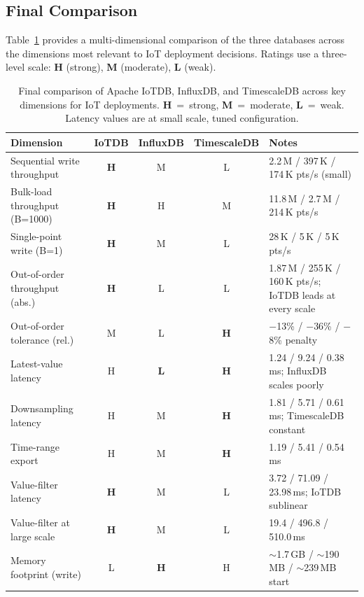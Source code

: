 \subsection{Final Comparison}

Table~\ref{tab:final} provides a multi-dimensional comparison of the three databases
across the dimensions most relevant to IoT deployment decisions. Ratings use a three-level
scale: \textbf{H} (strong), \textbf{M} (moderate), \textbf{L} (weak).

\begin{table}[t]
  \centering
  \caption{Final comparison of Apache IoTDB, InfluxDB, and TimescaleDB across key dimensions
           for IoT deployments. \textbf{H}~=~strong, \textbf{M}~=~moderate, \textbf{L}~=~weak.
           Latency values are at small scale, tuned configuration.}
  \label{tab:final}
  \begin{tabular}{lcccl}
    \hline
    \textbf{Dimension} & \textbf{IoTDB} & \textbf{InfluxDB} & \textbf{TimescaleDB} & \textbf{Notes} \\
    \hline
    Sequential write throughput   & \textbf{H} & M & L & 2.2\,M / 397\,K / 174\,K pts/s (small) \\
    Bulk-load throughput (B=1000) & \textbf{H} & H & M & 11.8\,M / 2.7\,M / 214\,K pts/s \\
    Single-point write (B=1)      & \textbf{H} & M & L & 28\,K / 5\,K / 5\,K pts/s \\
    Out-of-order throughput (abs.) & \textbf{H} & L & L & 1.87\,M / 255\,K / 160\,K pts/s; IoTDB leads at every scale \\
    Out-of-order tolerance (rel.) & M & L & \textbf{H} & $-$13\% / $-$36\% / $-$8\% penalty \\
    Latest-value latency          & H & \textbf{L} & \textbf{H} & 1.24 / 9.24 / 0.38\,ms; InfluxDB scales poorly \\
    Downsampling latency          & H & M & \textbf{H} & 1.81 / 5.71 / 0.61\,ms; TimescaleDB constant \\
    Time-range export             & H & M & \textbf{H} & 1.19 / 5.41 / 0.54\,ms \\
    Value-filter latency          & \textbf{H} & M & L & 3.72 / 71.09 / 23.98\,ms; IoTDB sublinear \\
    Value-filter at large scale   & \textbf{H} & M & L & 19.4 / 496.8 / 510.0\,ms \\
    Memory footprint (write)      & L & \textbf{H} & H & $\sim$1.7\,GB / $\sim$190\,MB / $\sim$239\,MB start \\

\end{tabular}
\end{table}
